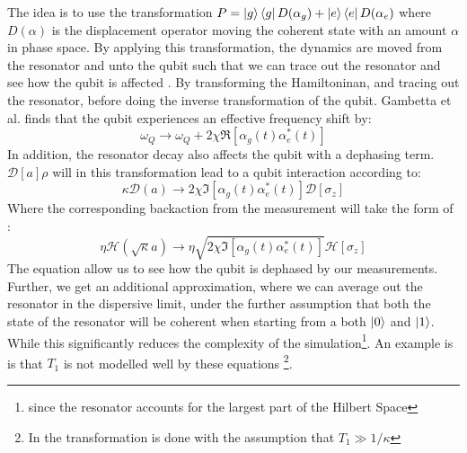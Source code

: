 The idea is to use the transformation $P = \ket{g}\bra{g}D(\alpha_g) + \ket{e}\bra{e}D(\alpha_e)$ where $D(\alpha)$ is the displacement operator moving the coherent state with an amount $\alpha$ in phase space. By applying this transformation, the dynamics are moved from the resonator and unto the qubit such that we can trace out the resonator and see how the qubit is affected \cite{gambetta_quantum_2008}. 
By transforming the Hamiltoninan, and tracing out the resonator, before doing the inverse transformation of the qubit. Gambetta et al. finds that the qubit experiences an effective frequency shift by:
\begin{equation}
    \omega_Q \to \omega_Q + 2 \chi \Re[\alpha_g(t)\alpha_e^*(t)]
\end{equation}
In addition, the resonator decay also affects the qubit with a dephasing term. $\mathcal{D}[a]\rho$ will in this transformation lead to a qubit interaction according to:
\begin{equation}
    \kappa\mathcal{D}(a) \to 2\chi \Im[\alpha_g(t)\alpha_e^*(t)] \mathcal{D}[\sigma_z]
\end{equation}
Where the corresponding backaction from the measurement will take the form of \cite{campagne-ibarcq_measurement_nodate}:
\begin{equation}
    \eta\mathcal{H}(\sqrt{\kappa} a) \to \eta \sqrt{2 \chi \Im[\alpha_g(t)\alpha_e^*(t)]} \mathcal{H}[\sigma_z]
\end{equation}
The equation allow us to see how the qubit is dephased by our measurements. Further, we get an additional approximation, where we can average out the resonator in the dispersive limit, under the further assumption that both the state of the resonator will be coherent when starting from a both $\ket{0}$ and $\ket{1}$. While this significantly reduces the complexity of the simulation\footnote{since the resonator accounts for the largest part of the Hilbert Space}. An example is is that $T_1$ is not modelled well by these equations \footnote{In \cite{gambetta_quantum_2008} the transformation is done with the assumption that $T_1 \gg 1 / \kappa$}. 